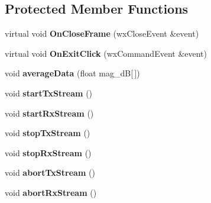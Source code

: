 \subsection*{Protected Member Functions}
\begin{DoxyCompactItemize}
\item 
\hypertarget{class_main_frame_ad96135c590b5739d8982b45a4778424e}{virtual void {\bfseries On\-Close\-Frame} (wx\-Close\-Event \&event)}\label{class_main_frame_ad96135c590b5739d8982b45a4778424e}

\item 
\hypertarget{class_main_frame_ab9ed8ca71402b68b41fd5a7cedb20928}{virtual void {\bfseries On\-Exit\-Click} (wx\-Command\-Event \&event)}\label{class_main_frame_ab9ed8ca71402b68b41fd5a7cedb20928}

\item 
\hypertarget{class_main_frame_a31585b905eee875973b106f4e79c263f}{void {\bfseries average\-Data} (float mag\-\_\-d\-B\mbox{[}$\,$\mbox{]})}\label{class_main_frame_a31585b905eee875973b106f4e79c263f}

\item 
\hypertarget{class_main_frame_af01eb2c59f1a9bcee0b956f8a72004c0}{void {\bfseries start\-Tx\-Stream} ()}\label{class_main_frame_af01eb2c59f1a9bcee0b956f8a72004c0}

\item 
\hypertarget{class_main_frame_ad17245c1c9c295fc216fc6615f31e0a5}{void {\bfseries start\-Rx\-Stream} ()}\label{class_main_frame_ad17245c1c9c295fc216fc6615f31e0a5}

\item 
\hypertarget{class_main_frame_a9c5b263953c6703f0e721ba5694391f4}{void {\bfseries stop\-Tx\-Stream} ()}\label{class_main_frame_a9c5b263953c6703f0e721ba5694391f4}

\item 
\hypertarget{class_main_frame_a91b813d6f6fc4c3777e332b018999a8d}{void {\bfseries stop\-Rx\-Stream} ()}\label{class_main_frame_a91b813d6f6fc4c3777e332b018999a8d}

\item 
\hypertarget{class_main_frame_abbe36f1aac14dba091ab0ec0c6ef2936}{void {\bfseries abort\-Tx\-Stream} ()}\label{class_main_frame_abbe36f1aac14dba091ab0ec0c6ef2936}

\item 
\hypertarget{class_main_frame_a44e48d93613d91be1db586553466feac}{void {\bfseries abort\-Rx\-Stream} ()}\label{class_main_frame_a44e48d93613d91be1db586553466feac}


\end{DoxyCompactItemize}
